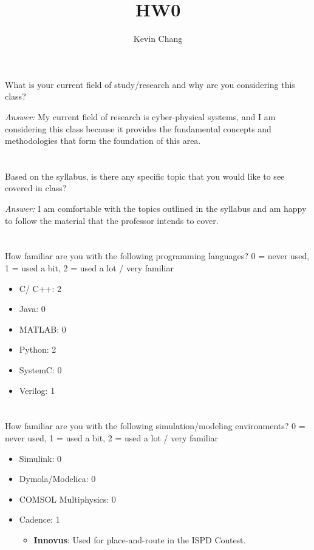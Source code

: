 \documentclass[a4paper]{article}
\title{HW0}
\author{Kevin Chang}
\begin{document}
\maketitle

\section{}
What is your current field of study/research and why are you considering this class?

\emph{Answer:}
My current field of research is cyber-physical systems, and I am considering this class because it provides the fundamental concepts and methodologies that form the foundation of this area.

\section{}
Based on the syllabus, is there any specific topic that you would like to see covered in class?

\emph{Answer:}
I am comfortable with the topics outlined in the syllabus and am happy to follow the material that the professor intends to cover.

\section{}
How familiar are you with the following programming languages? 0 = never used, 1 = used a bit, 2 = used a lot / very familiar

\begin{itemize}
    \item C/ C++: 2
    \item Java: 0
    \item MATLAB: 0
    \item Python: 2
    \item SystemC: 0
    \item Verilog: 1
\end{itemize}

\section{}
How familiar are you with the following simulation/modeling environments? 0 = never used, 1 = used a bit, 2 = used a lot / very familiar

\begin{itemize}
    \item Simulink: 0
    \item Dymola/Modelica: 0
    \item COMSOL Multiphysics: 0
    \item Cadence: 1
        \begin{itemize}
            \item \textbf{Innovus}: Used for place-and-route in the ISPD Contest.
        \end{itemize}
\end{itemize}
\end{document}
